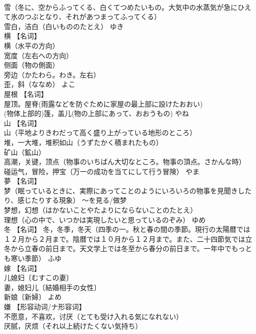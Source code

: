 \documentclass[8pt]{extreport}
\begin{document}
\begin{CJK}{UTF8}{min}
\\	雪（冬に、空からふってくる、白くてつめたいもの。大気中の水蒸気が急にひえて氷のつぶとなり、それがあつまってふってくる） 
\\	雪白，洁白（白いもののたとえ）	ゆき	
\\	横	【名词】 
\\	横（水平の方向） 
\\	宽度（左右への方向） 
\\	侧面（物の側面） 
\\	旁边（かたわら。わき。左右） 
\\	歪，斜（ななめ）	よこ	
\\	屋根	【名词】 
\\	屋顶。屋脊(雨露などを防ぐために家屋の最上部に設けたおおい) 
\\	(物体上部的)篷，盖儿(物の上部にあって、おおうもの)	やね	
\\	山	【名词】 
\\	山（平地よりきわだって高く盛り上がっている地形のところ） 
\\	堆，一大堆，堆积如山（うずたかく積まれたもの） 
\\	矿山（鉱山） 
\\	高潮，关键，顶点（物事のいちばん大切なところ。物事の頂点。さかんな時） 
\\	碰运气，冒险，押宝（万一の成功を当てにして行う冒険）	やま	
\\	夢	【名词】 
\\	梦（眠っているときに、実際にあってことのようにいろいろの物事を見聞きしたり、感じたりする現象） ～を見る/做梦 
\\	梦想，幻想（はかないことやたよりにならないことのたとえ） 
\\	理想（心の中で、いつかは実現したいと思っているのぞみ）	ゆめ	
\\	冬	【名词】 冬，冬季，冬天（四季の一。秋と春の間の季節。現行の太陽暦では１２月から２月まで。陰暦では１０月から１２月まで。また、二十四節気では立冬から立春の前日まで。天文学上では冬至から春分の前日まで。一年中でもっとも寒い季節）	ふゆ	
\\	嫁	【名词】 
\\	儿媳妇〔むすこの妻〕 
\\	妻，媳妇儿〔結婚相手の女性〕 
\\	新娘〔新婦〕	よめ	
\\	嫌	【形容动词/ナ形容词】 
\\	不愿意，不喜欢，讨厌（とても受け入れる気になれない） 
\\	厌腻，厌烦（それ以上続けたくない気持ち） 

\end{CJK}
\end{document}
